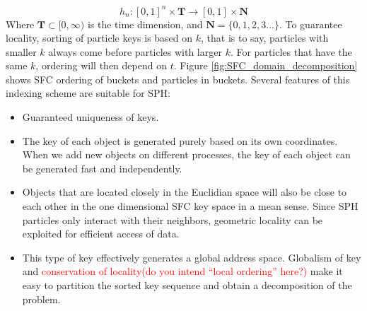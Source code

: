\documentclass[procedia]{easychair}
\begin{document}
\begin{equation}
h_n: [0,1]^n \times \textbf{T} \rightarrow [0,1] \times \textbf{N}
\end{equation}
Where $\textbf{T} \subset [0,\infty)$ is the time dimension, and $\textbf{N}=\lbrace 0, 1, 2, 3...\rbrace$.
To guarantee locality, sorting of particle keys is based on $k$, that is to say, particles with smaller $k$ always come before particles with larger $k$. For particles that have the same $k$, ordering will then depend on $t$. Figure \ref{fig:SFC_domain_decomposition} shows SFC ordering of buckets and particles in buckets. 
Several features of this indexing scheme are suitable for SPH:
\begin{itemize}
\item Guaranteed uniqueness of keys.
\item The key of each object is generated purely based on its own coordinates. When we add new objects on different processes, the key of each object can be generated fast and independently.
\item Objects that are located closely in the Euclidian space will also be close to each other in the one dimensional SFC key space in a mean sense. Since SPH particles only interact with their neighbors, geometric locality can be exploited for efficient access of data.
\item This type of key effectively generates a global address space. Globalism of key and \textcolor{red}{conservation of locality}\textcolor{red}{(do you intend ``local ordering'' here?)} make it easy to partition the sorted key sequence and obtain a decomposition of the problem.
\end{itemize}
\end{document}
